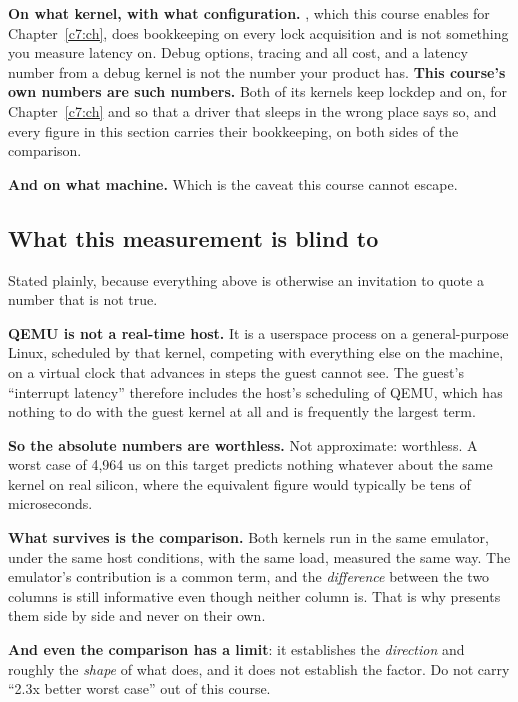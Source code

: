 \textbf{On what kernel, with what configuration.} , which this course
enables for Chapter~\ref{c7:ch}, does bookkeeping on every lock acquisition and is not something you
measure latency on. Debug options, tracing and  all cost, and a latency number
from a debug kernel is not the number your product has. \textbf{This course's own numbers are such
numbers.} Both of its kernels keep lockdep and  on, 
for Chapter~\ref{c7:ch} and  so that a driver that sleeps in the wrong place says
so, and every figure in this section carries their bookkeeping, on both sides of the comparison.

\textbf{And on what machine.} Which is the caveat this course cannot escape.

\subsection{What this measurement is blind to}
\label{c12:app:b6}

Stated plainly, because everything above is otherwise an invitation to quote a number that is not
true.

\textbf{QEMU is not a real-time host.} It is a userspace process on a general-purpose Linux,
scheduled by that kernel, competing with everything else on the machine, on a virtual clock that
advances in steps the guest cannot see. The guest's ``interrupt latency'' therefore includes the
host's scheduling of QEMU, which has nothing to do with the guest kernel at all and is frequently
the largest term.

\textbf{So the absolute numbers are worthless.} Not approximate: worthless. A worst case of 4,964 us
on this target predicts nothing whatever about the same kernel on real silicon, where the equivalent
figure would typically be tens of microseconds.

\textbf{What survives is the comparison.} Both kernels run in the same emulator, under the same host
conditions, with the same load, measured the same way. The emulator's contribution is a common term,
and the \emph{difference} between the two columns is still informative even though neither column
is. That is why  presents them side by side and never on their own.

\textbf{And even the comparison has a limit}: it establishes the \emph{direction} and roughly the
\emph{shape} of what  does, and it does not establish the factor. Do not carry
``2.3x better worst case'' out of this course.

